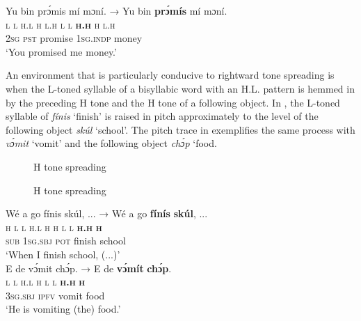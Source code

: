 \ea%
    \label{ex:key:50}
    \glll   Yu  bin  prɔ́mis  mí    mɔní.  →    Yu  bin  \textbf{prɔ́m\'is}  mí  mɔní.\\
\textsc{l}  \textsc{l}  \textsc{h.l}    \textsc{h}    \textsc{l.h}    {}    \textsc{l}  \textsc{l}  \textbf{\textsc{h.h}}    \textsc{h}  \textsc{l.h}\\
\textsc{2sg}  \textsc{pst}  promise  \textsc{1sg.indp}  money\\
\glt ‘You promised me money.’
\z

An environment that is particularly conducive to rightward tone spreading is when the L-toned syllable of a bisyllabic word with an H.L. pattern is hemmed in by the preceding H tone and the H tone of a following object. In , the L-toned syllable of \textit{fínis} ‘finish’ is raised in pitch approximately to the level of the following object \textit{skúl} ‘school’. The pitch trace in  exemplifies the same process with \textit{vɔ́mit} ‘vomit’ and the following object \textit{chɔ́p} ‘food.


\begin{figure}
\caption{H tone spreading}
\label{fig:key:3.12}
\end{figure}

\begin{figure}
\caption{H tone spreading}
\label{fig:key:3.13}
\end{figure}

\ea\label{ex:key:51}
\glll Wé  a    go  fínis    skúl,  \op...\cp{}  →    Wé  a  go  \textbf{f\'inís}  \textbf{skúl},  \op...\cp\\
\textsc{h}  \textsc{l}    \textsc{l}  \textsc{h.l}    \textsc{h}    {}  {}  \textsc{h}  \textsc{l}  \textsc{l}  \textbf{\textsc{h.h}}    \textbf{\textsc{h}}\\
\textsc{sub}  \textsc{1sg.sbj}  \textsc{pot}  finish  school\\
\glt  ‘When I finish school, (...)’\\
\z
\ea\label{ex:key:52}   
\glll E    de    vɔ́mit  chɔ́p.  →  E  de  \textbf{v\'ɔmít}  \textbf{chɔ́p}.\\
\textsc{l}    \textsc{l}    \textsc{h.l}    \textsc{h}    {}    \textsc{l}  \textsc{l}  \textbf{\textsc{h.h}  }  \textbf{\textsc{h}}\\
\textsc{3sg.sbj}  \textsc{ipfv}    vomit  food\\
\glt  ‘He is vomiting (the) food.’\\
\z

